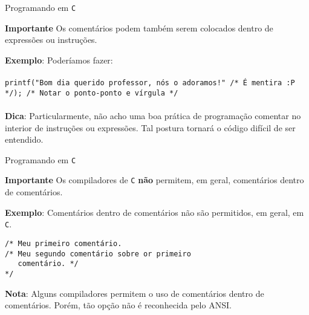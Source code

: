 \documentclass{beamer}
\newcommand{\C}{\texttt{C}}
\begin{document}
\begin{frame}{Programando em \C}
\begin{block}{\textbf{Importante}}
Os comentários podem também serem colocados dentro de expressões ou instruções. 
\end{block}
\vspace{0.3cm}
\textbf{Exemplo}: Poderíamos fazer:\\~\\ \texttt{printf("Bom dia querido professor, nós o adoramos!" /* É mentira :P */); /* Notar o ponto-ponto e vírgula */}\\~\\

\textbf{Dica}: Particularmente, não acho uma boa prática de programação comentar no interior de instruções ou expressões. Tal postura tornará o código difícil de ser entendido.
\end{frame}
 
\begin{frame}[fragile]{Programando em \C}
\begin{block}{\textbf{Importante}}
Os compiladores de \texttt{C} \textbf{não} permitem, em geral, comentários dentro de comentários.
\end{block}
\textbf{Exemplo}: Comentários dentro de comentários não são permitidos, em geral, em \C.
\begin{verbatim}
/* Meu primeiro comentário.
/* Meu segundo comentário sobre or primeiro
   comentário. */
*/
\end{verbatim}
\textbf{Nota}: Alguns compiladores permitem o uso de comentários dentro de comentários. Porém, tão opção não é reconhecida pelo ANSI. 
\end{frame} 
 
\end{document}
